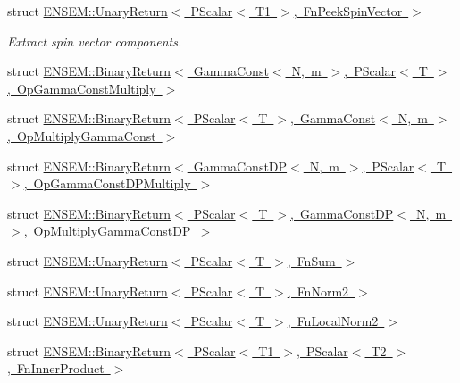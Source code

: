 \begin{DoxyCompactItemize}
\item 
struct \mbox{\hyperlink{structENSEM_1_1UnaryReturn_3_01PScalar_3_01T1_01_4_00_01FnPeekSpinVector_01_4}{E\+N\+S\+E\+M\+::\+Unary\+Return$<$ P\+Scalar$<$ T1 $>$, Fn\+Peek\+Spin\+Vector $>$}}
\begin{DoxyCompactList}\small\item\em Extract spin vector components. \end{DoxyCompactList}\item 
struct \mbox{\hyperlink{structENSEM_1_1BinaryReturn_3_01GammaConst_3_01N_00_01m_01_4_00_01PScalar_3_01T_01_4_00_01OpGammaConstMultiply_01_4}{E\+N\+S\+E\+M\+::\+Binary\+Return$<$ Gamma\+Const$<$ N, m $>$, P\+Scalar$<$ T $>$, Op\+Gamma\+Const\+Multiply $>$}}
\item 
struct \mbox{\hyperlink{structENSEM_1_1BinaryReturn_3_01PScalar_3_01T_01_4_00_01GammaConst_3_01N_00_01m_01_4_00_01OpMultiplyGammaConst_01_4}{E\+N\+S\+E\+M\+::\+Binary\+Return$<$ P\+Scalar$<$ T $>$, Gamma\+Const$<$ N, m $>$, Op\+Multiply\+Gamma\+Const $>$}}
\item 
struct \mbox{\hyperlink{structENSEM_1_1BinaryReturn_3_01GammaConstDP_3_01N_00_01m_01_4_00_01PScalar_3_01T_01_4_00_01OpGammaConstDPMultiply_01_4}{E\+N\+S\+E\+M\+::\+Binary\+Return$<$ Gamma\+Const\+D\+P$<$ N, m $>$, P\+Scalar$<$ T $>$, Op\+Gamma\+Const\+D\+P\+Multiply $>$}}
\item 
struct \mbox{\hyperlink{structENSEM_1_1BinaryReturn_3_01PScalar_3_01T_01_4_00_01GammaConstDP_3_01N_00_01m_01_4_00_01OpMultiplyGammaConstDP_01_4}{E\+N\+S\+E\+M\+::\+Binary\+Return$<$ P\+Scalar$<$ T $>$, Gamma\+Const\+D\+P$<$ N, m $>$, Op\+Multiply\+Gamma\+Const\+D\+P $>$}}
\item 
struct \mbox{\hyperlink{structENSEM_1_1UnaryReturn_3_01PScalar_3_01T_01_4_00_01FnSum_01_4}{E\+N\+S\+E\+M\+::\+Unary\+Return$<$ P\+Scalar$<$ T $>$, Fn\+Sum $>$}}
\item 
struct \mbox{\hyperlink{structENSEM_1_1UnaryReturn_3_01PScalar_3_01T_01_4_00_01FnNorm2_01_4}{E\+N\+S\+E\+M\+::\+Unary\+Return$<$ P\+Scalar$<$ T $>$, Fn\+Norm2 $>$}}
\item 
struct \mbox{\hyperlink{structENSEM_1_1UnaryReturn_3_01PScalar_3_01T_01_4_00_01FnLocalNorm2_01_4}{E\+N\+S\+E\+M\+::\+Unary\+Return$<$ P\+Scalar$<$ T $>$, Fn\+Local\+Norm2 $>$}}
\item 
struct \mbox{\hyperlink{structENSEM_1_1BinaryReturn_3_01PScalar_3_01T1_01_4_00_01PScalar_3_01T2_01_4_00_01FnInnerProduct_01_4}{E\+N\+S\+E\+M\+::\+Binary\+Return$<$ P\+Scalar$<$ T1 $>$, P\+Scalar$<$ T2 $>$, Fn\+Inner\+Product $>$}}

\end{DoxyCompactItemize}
